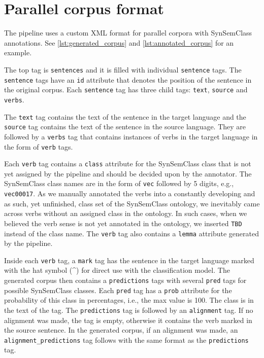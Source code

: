 \chapter{Parallel corpus format}
\label{parallel_corpus_format}

The pipeline uses a custom XML format for parallel corpora with SynSemClass annotations. See \cref{lst:generated_corpus} and \cref{lst:annotated_corpus} for an example.

The top tag is \texttt{sentences} and it is filled with individual \texttt{sentence} tags. The \texttt{sentence} tags have an \texttt{id} attribute that denotes the position of the sentence in the original corpus. Each \texttt{sentence} tag has three child tags: \texttt{text}, \texttt{source} and \texttt{verbs}.

The \texttt{text} tag contains the text of the sentence in the target language and the \texttt{source} tag contains the text of the sentence in the source language. They are followed by a \texttt{verbs} tag that contains instances of verbs in the target language in the form of \texttt{verb} tags.

Each \texttt{verb} tag contains a \texttt{class} attribute for the SynSemClass class that is not yet assigned by the pipeline and should be decided upon by the annotator. The SynSemClass class names are in the form of \texttt{vec} followed by 5 digits, e.g., \texttt{vec00017}. As we manually annotated the verbs into a constantly developing and as such, yet unfinished, class set of the SynSemClass ontology, we inevitably came across verbs without an assigned class in the ontology. In such cases, when we believed the verb sense is not yet annotated in the ontology, we inserted \texttt{TBD} instead of the class name. The \texttt{verb} tag also contains a \texttt{lemma} attribute generated by the pipeline.

Inside each \texttt{verb} tag, a \texttt{mark} tag has the sentence in the target language marked with the hat symbol (\textasciicircum) for direct use with the classification model. The generated corpus then contains a \texttt{predictions} tags with several \texttt{pred} tags for possible SynSemClass classes. Each \texttt{pred} tag has a \texttt{prob} attribute for the probability of this class in percentages, i.e., the max value is 100. The class is in the text of the tag. The \texttt{predictions} tag is followed by an \texttt{alignment} tag. If no alignment was made, the tag is empty, otherwise it contains the verb marked in the source sentence. In the generated corpus, if an alignment was made, an \verb|alignment_predictions| tag follows with the same format as the \texttt{predictions} tag.

